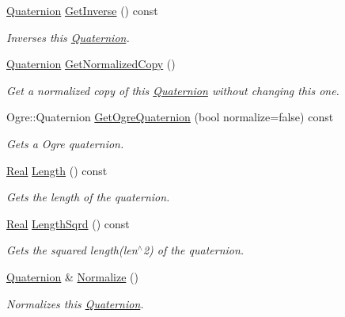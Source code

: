 \begin{DoxyCompactItemize}
\hyperlink{classphys_1_1Quaternion}{Quaternion} \hyperlink{classphys_1_1Quaternion_a384833001b14c132553af190e6ebc41e}{GetInverse} () const 
\begin{DoxyCompactList}\small\item\em Inverses this \hyperlink{classphys_1_1Quaternion}{Quaternion}. \item\end{DoxyCompactList}\item 
\hyperlink{classphys_1_1Quaternion}{Quaternion} \hyperlink{classphys_1_1Quaternion_a70d6cf4b57f3e74469089747ef755583}{GetNormalizedCopy} ()
\begin{DoxyCompactList}\small\item\em Get a normalized copy of this \hyperlink{classphys_1_1Quaternion}{Quaternion} without changing this one. \item\end{DoxyCompactList}\item 
Ogre::Quaternion \hyperlink{classphys_1_1Quaternion_aa22645e2e2972007bcf61cd2f8e506d0}{GetOgreQuaternion} (bool normalize=false) const 
\begin{DoxyCompactList}\small\item\em Gets a Ogre quaternion. \item\end{DoxyCompactList}\item 
\hyperlink{namespacephys_af7eb897198d265b8e868f45240230d5f}{Real} \hyperlink{classphys_1_1Quaternion_aaa860619e9370244d1b538dd9aaf0efc}{Length} () const 
\begin{DoxyCompactList}\small\item\em Gets the length of the quaternion. \item\end{DoxyCompactList}\item 
\hyperlink{namespacephys_af7eb897198d265b8e868f45240230d5f}{Real} \hyperlink{classphys_1_1Quaternion_ac81b52051cc7dcb73fa01fb963d068a6}{LengthSqrd} () const 
\begin{DoxyCompactList}\small\item\em Gets the squared length(len$^\wedge$2) of the quaternion. \item\end{DoxyCompactList}\item 
\hyperlink{classphys_1_1Quaternion}{Quaternion} \& \hyperlink{classphys_1_1Quaternion_afafa852e782d0fe20d41bc745c8a4734}{Normalize} ()
\begin{DoxyCompactList}\small\item\em Normalizes this \hyperlink{classphys_1_1Quaternion}{Quaternion}. \item\end{DoxyCompactList}\item 

\end{DoxyCompactItemize}
